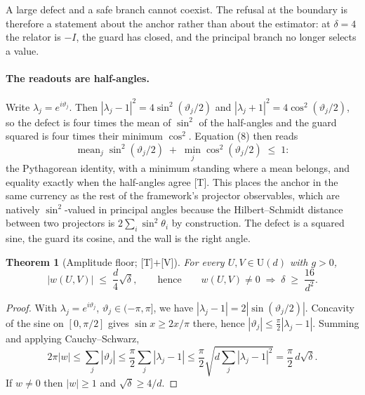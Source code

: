 \documentclass[11pt]{article}
\theoremstyle{definition}
\theoremstyle{plain}
\newtheorem{theorem}[definition]{Theorem}
\begin{document}
A large defect and a safe branch cannot coexist. The refusal at the boundary is
therefore a statement about the anchor rather than about the estimator: at
$\delta = 4$ the relator is $-I$, the guard has closed, and the principal branch no
longer selects a value.

\paragraph{The readouts are half-angles.}
Write $\lambda_j = e^{i\vartheta_j}$. Then
$|\lambda_j - 1|^{2} = 4\sin^{2}(\vartheta_j/2)$ and
$|\lambda_j + 1|^{2} = 4\cos^{2}(\vartheta_j/2)$, so the defect is four times the
mean of $\sin^{2}$ of the half-angles and the guard squared is four times their
minimum $\cos^{2}$. Equation (8) then reads
\begin{equation}
\operatorname{mean}_j \sin^{2}(\vartheta_j/2) \;+\;
\min_j \cos^{2}(\vartheta_j/2) \;\le\; 1 :
\end{equation}
the Pythagorean identity, with a minimum standing where a mean belongs, and
equality exactly when the half-angles agree [T]. This places the anchor in the same
currency as the rest of the framework's projector observables, which are natively
$\sin^{2}$-valued in principal angles because the Hilbert--Schmidt distance between
two projectors is $2\sum_i \sin^2\theta_i$ by construction. The defect is a squared
sine, the guard its cosine, and the wall is the right angle.

\begin{theorem}[Amplitude floor; {[T]}$+${[V]}]
For every $U,V \in \mathrm{U}(d)$ with $g > 0$,
\begin{equation}
|w(U,V)| \;\le\; \frac{d}{4}\sqrt{\delta},
\qquad\text{hence}\qquad
w(U,V) \neq 0 \;\Longrightarrow\; \delta \;\ge\; \frac{16}{d^{2}} .
\end{equation}
\end{theorem}

\begin{proof}
With $\lambda_j = e^{i\vartheta_j}$, $\vartheta_j \in (-\pi,\pi]$, we have
$|\lambda_j - 1| = 2|\sin(\vartheta_j/2)|$. Concavity of the sine on $[0,\pi/2]$
gives $\sin x \ge 2x/\pi$ there, hence
$|\vartheta_j| \le \tfrac{\pi}{2}|\lambda_j - 1|$. Summing and applying
Cauchy--Schwarz,
\[
2\pi |w| \le \sum_j |\vartheta_j| \le \frac{\pi}{2}\sum_j |\lambda_j - 1|
\le \frac{\pi}{2}\sqrt{d\sum_j |\lambda_j-1|^{2}} = \frac{\pi}{2}\,d\sqrt{\delta}.
\]
If $w \neq 0$ then $|w| \ge 1$ and $\sqrt{\delta} \ge 4/d$.
\end{proof}
\end{document}
